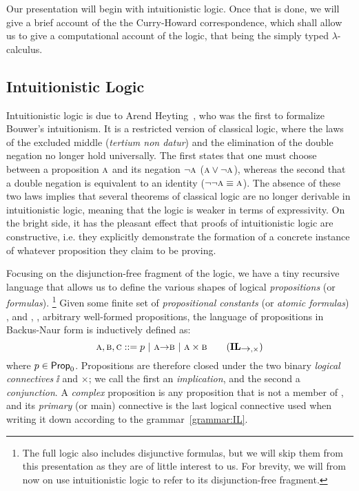 Our presentation will begin with intuitionistic logic. 
Once that is done, we will give a brief account of the the Curry-Howard correspondence, which shall allow us to give a computational account of the logic, that being the simply typed $\lambda$-calculus.

\subsection{Intuitionistic Logic}
\label{subsection:intuitionistic_logic}
Intuitionistic logic is due to Arend Heyting~\cite{heyting1930}, who was the first to formalize Bouwer's intuitionism.
It is a restricted version of classical logic, where the laws of the excluded middle (\textit{tertium non datur}) and the elimination of the double negation no longer hold universally.
The first states that one must choose between a proposition $\prop{A}$ and its negation $\neg \prop{A}$ ($\prop{A} \vee \neg \prop{A}$), whereas the second that a double negation is equivalent to an identity ($\neg \neg \prop{A} \equiv \prop{A}$).
The absence of these two laws implies that several theorems of classical logic are no longer derivable in intuitionistic logic, meaning that the logic is weaker in terms of expressivity.
On the bright side, it has the pleasant effect that proofs of intuitionistic logic are constructive, i.e. they explicitly demonstrate the formation of a concrete instance of whatever proposition they claim to be proving.

Focusing on the disjunction-free fragment of the logic, we have a tiny recursive language that allows us to define the various shapes of logical \textit{propositions} (or \textit{formulas}).%
\footnote{The full logic also includes disjunctive formulas, but we will skip them from this presentation as they are of little interest to us. For brevity, we will from now on use intuitionistic logic to refer to its disjunction-free fragment.}
Given some finite set of \textit{propositional constants} (or \textit{atomic formulas}) \propcon{}, and , ,  arbitrary well-formed propositions, the language of propositions in Backus-Naur form is inductively defined as:
\begin{equation}
\prop{A}, \prop{B}, \prop{C} ::= p \ | \ \prop{A} \ii \prop{B} \ | \ \prop{A} \times \prop{B} 
\tag{$\IL_{\ii, \times}$}
\label{grammar:IL}
\end{equation}
where $p \in \mathsf{Prop}_0{}$.
Propositions are therefore closed under the two binary \textit{logical connectives} $\ii$ and $\times$; we call the first an \textit{implication}, and the second a \textit{conjunction}. 
A \textit{complex} proposition is any proposition that is not a member of \propcon{}, and its \textit{primary} (or main) connective is the last logical connective used when writing it down according to the grammar~\ref{grammar:IL}.

